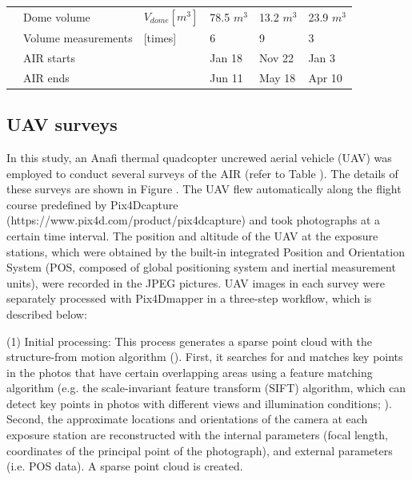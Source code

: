 \documentclass[utf8]{frontiersSCNS} %
\begin{document}
\begin{table}
\begin{tabular}{@{}|llllll|@{}}
		\multicolumn{1}{|l|}{\multirow{4}{*}{\rotatebox[origin=c]{90}{AIR}}}
		                       & Dome volume                 & $V_{dome}[m^{3}]$         & 78.5 $m^{3}$  & 13.2 $m^{3}$  & 23.9 $m^{3}$  \\
		\multicolumn{1}{|l|}{} & Volume measurements         & [times]                   & 6             & 9             & 3             \\
		\multicolumn{1}{|l|}{} & AIR starts                  &                           & Jan 18        & Nov 22        & Jan 3         \\
		\multicolumn{1}{|l|}{} & AIR ends                    &                           & Jun 11        & May 18        & Apr 10        \\ \bottomrule
	\end{tabular}
\end{table}

\subsection{UAV surveys}
In this study, an Anafi thermal quadcopter uncrewed aerial vehicle (UAV) was employed to conduct several surveys of the
AIR (refer to Table ).  The details of these surveys are shown in Figure . The UAV flew automatically along the flight
course predefined by Pix4Dcapture (https://www.pix4d.com/product/pix4dcapture) and took photographs at a certain time
interval. The position and altitude of the UAV at the exposure stations, which were obtained by the built-in integrated
Position and Orientation System (POS, composed of global positioning system and inertial measurement units), were
recorded in the JPEG pictures. UAV images in each survey were separately processed with Pix4Dmapper in a three-step
workflow, which is described below:

(1) Initial processing: This process generates a sparse point cloud with the structure-from motion algorithm
(\cite{Turner_2012}). First, it searches for and matches key points in the photos that have certain overlapping areas using a
feature matching algorithm (e.g. the scale-invariant feature transform (SIFT) algorithm, which can detect key points in
photos with different views and illumination conditions; \cite{Lowe_2004}). Second, the approximate locations and
orientations of the camera at each exposure station are reconstructed with the internal parameters (focal length,
coordinates of the principal point of the photograph), and external parameters (i.e. POS data). A sparse point cloud is
created.
\end{document}
